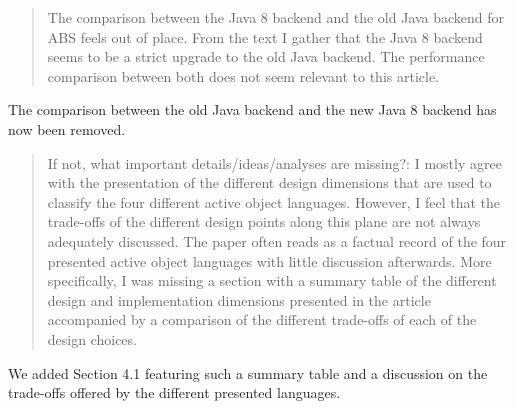 \documentclass{article}
\begin{document}
\begin{quote}
 The comparison between the Java 8 backend and the old Java backend 
for ABS feels out of place. From the text I gather that the Java 8 backend seems to be a 
strict upgrade to the old Java backend. The performance comparison between both does not 
seem relevant to this article.
\end{quote}
The comparison between the old Java backend and the new Java 8 backend has now been 
removed.

\begin{quote}
	If not, what important details/ideas/analyses are missing?: I mostly agree with the 
presentation of the different design dimensions that are used to classify the four 
different active object languages. However, I feel that the trade-offs of the different 
design points along this plane are not always adequately discussed. The paper often reads 
as a factual record of the four presented active object languages with little discussion 
afterwards. More specifically, I was missing a section with a summary table of the 
different design and implementation dimensions presented in the article accompanied by a 
comparison of the different trade-offs of each of the design choices.
\end{quote}
We added  Section 4.1 featuring such a summary table and a discussion on the 
trade-offs offered by the different presented languages.
\end{document}
